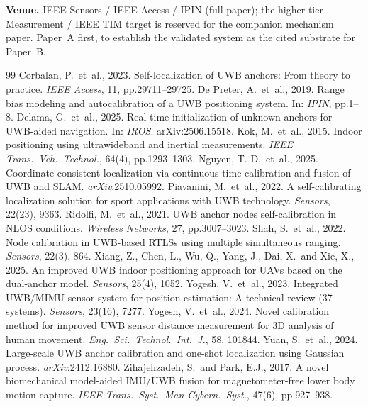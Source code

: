 \documentclass[10pt,a4paper]{article}
\begin{document}
\textbf{Venue.} IEEE Sensors / IEEE Access / IPIN (full paper); the higher-tier Measurement / IEEE
TIM target is reserved for the companion mechanism paper. Paper~A first, to establish the validated
system as the cited substrate for Paper~B.

\begin{thebibliography}{99}
\small
{} Corbalan, P.\ et~al., 2023. Self-localization of UWB anchors:
From theory to practice. \emph{IEEE Access}, 11, pp.29711--29725.
 De Preter, A.\ et~al., 2019. Range bias modeling and
autocalibration of a UWB positioning system. In: \emph{IPIN}, pp.1--8.
 Delama, G.\ et~al., 2025. Real-time initialization of unknown
anchors for UWB-aided navigation. In: \emph{IROS}. arXiv:2506.15518.
 Kok, M.\ et~al., 2015. Indoor positioning using ultrawideband and
inertial measurements. \emph{IEEE Trans.\ Veh.\ Technol.}, 64(4), pp.1293--1303.
 Nguyen, T.-D.\ et~al., 2025. Coordinate-consistent localization
via continuous-time calibration and fusion of UWB and SLAM. \emph{arXiv}:2510.05992.
 Piavanini, M.\ et~al., 2022. A self-calibrating
localization solution for sport applications with UWB technology. \emph{Sensors}, 22(23), 9363.
 Ridolfi, M.\ et~al., 2021. UWB anchor nodes self-calibration in
NLOS conditions. \emph{Wireless Networks}, 27, pp.3007--3023.
 Shah, S.\ et~al., 2022. Node calibration in UWB-based RTLSs using
multiple simultaneous ranging. \emph{Sensors}, 22(3), 864.
 Xiang, Z., Chen, L., Wu, Q., Yang, J., Dai, X.\ and Xie, X.,
2025. An improved UWB indoor positioning approach for UAVs based on the dual-anchor model.
\emph{Sensors}, 25(4), 1052.
 Yogesh, V.\ et~al., 2023. Integrated UWB/MIMU sensor system for
position estimation: A technical review (37 systems). \emph{Sensors}, 23(16), 7277.
 Yogesh, V.\ et~al., 2024. Novel calibration method for improved
UWB sensor distance measurement for 3D analysis of human movement. \emph{Eng.\ Sci.\ Technol.\ Int.\
J.}, 58, 101844.
 Yuan, S.\ et~al., 2024. Large-scale UWB anchor calibration and
one-shot localization using Gaussian process. \emph{arXiv}:2412.16880.
\bibitem[Zihajehzadeh(2017)]{zihajehzadeh_2017} Zihajehzadeh, S.\ and Park, E.J., 2017. A novel
biomechanical model-aided IMU/UWB fusion for magnetometer-free lower body motion capture. \emph{IEEE
Trans.\ Syst.\ Man Cybern.\ Syst.}, 47(6), pp.927--938.
\end{thebibliography}
\end{document}
